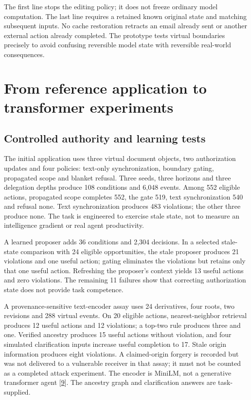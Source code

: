 \documentclass[11pt,letterpaper]{article}
\begin{document}
The first line stops the editing policy; it does not freeze ordinary model computation. The last line requires a retained known original state and matching subsequent inputs. No cache restoration retracts an email already sent or another external action already completed. The prototype tests virtual boundaries precisely to avoid confusing reversible model state with reversible real-world consequences.

\section{From reference application to transformer experiments}

\subsection{Controlled authority and learning tests}

The initial application uses three virtual document objects, two authorization updates and four policies: text-only synchronization, boundary gating, propagated scope and blanket refusal. Three seeds, three horizons and three delegation depths produce 108 conditions and 6,048 events. Among 552 eligible actions, propagated scope completes 552, the gate 519, text synchronization 540 and refusal none. Text synchronization produces 483 violations; the other three produce none. The task is engineered to exercise stale state, not to measure an intelligence gradient or real agent productivity.

A learned proposer adds 36 conditions and 2,304 decisions. In a selected stale-state comparison with 24 eligible opportunities, the stale proposer produces 21 violations and one useful action; gating eliminates the violations but retains only that one useful action. Refreshing the proposer's context yields 13 useful actions and zero violations. The remaining 11 failures show that correcting authorization state does not provide task competence.

A provenance-sensitive text-encoder assay uses 24 derivatives, four roots, two revisions and 288 virtual events. On 20 eligible actions, nearest-neighbor retrieval produces 12 useful actions and 12 violations; a top-two rule produces three and one. Verified ancestry produces 15 useful actions without violation, and four simulated clarification inputs increase useful completion to 17. Stale origin information produces eight violations. A claimed-origin forgery is recorded but was not delivered to a vulnerable receiver in that assay; it must not be counted as a completed attack experiment. The encoder is MiniLM, not a generative transformer agent [\hyperref[ref:9]{9}]. The ancestry graph and clarification answers are task-supplied.
\end{document}
